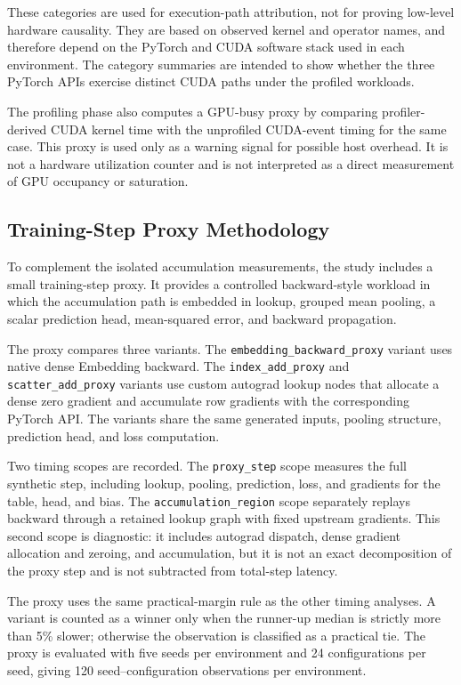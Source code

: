 These categories are used for execution-path attribution, not for proving low-level hardware causality. They are based on observed kernel and operator names, and therefore depend on the PyTorch and CUDA software stack used in each environment. The category summaries are intended to show whether the three PyTorch APIs exercise distinct CUDA paths under the profiled workloads.

The profiling phase also computes a GPU-busy proxy by comparing profiler-derived CUDA kernel time with the unprofiled CUDA-event timing for the same case. This proxy is used only as a warning signal for possible host overhead. It is not a hardware utilization counter and is not interpreted as a direct measurement of GPU occupancy or saturation.

\subsection{Training-Step Proxy Methodology}

To complement the isolated accumulation measurements, the study includes a small training-step proxy. It provides a controlled backward-style workload in which the accumulation path is embedded in lookup, grouped mean pooling, a scalar prediction head, mean-squared error, and backward propagation.

The proxy compares three variants. The \texttt{embedding\_backward\_proxy} variant uses native dense Embedding backward. The \texttt{index\_add\_proxy} and \texttt{scatter\_add\_proxy} variants use custom autograd lookup nodes that allocate a dense zero gradient and accumulate row gradients with the corresponding PyTorch API. The variants share the same generated inputs, pooling structure, prediction head, and loss computation.

Two timing scopes are recorded. The \texttt{proxy\_step} scope measures the full synthetic step, including lookup, pooling, prediction, loss, and gradients for the table, head, and bias. The \texttt{accumulation\_region} scope separately replays backward through a retained lookup graph with fixed upstream gradients. This second scope is diagnostic: it includes autograd dispatch, dense gradient allocation and zeroing, and accumulation, but it is not an exact decomposition of the proxy step and is not subtracted from total-step latency.

The proxy uses the same practical-margin rule as the other timing analyses. A variant is counted as a winner only when the runner-up median is strictly more than 5\% slower; otherwise the observation is classified as a practical tie. The proxy is evaluated with five seeds per environment and 24 configurations per seed, giving 120 seed--configuration observations per environment.

